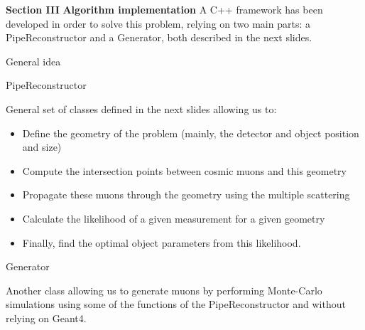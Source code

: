\documentclass[8 pt]{beamer}
\begin{document}
\begin{frame}{}
\centering
	\huge{\textbf{\color{mycolor} Section III}} \newline
	\LARGE{\textbf{\color{mycolor} Algorithm implementation \color{black}}} \vfill
\Large{A C++ framework has been developed in order to solve this problem, relying on two main parts: a PipeReconstructor and a Generator, both described in the next slides.} \vfill
\end{frame}

\begin{frame}{General idea}
\begin{exampleblock}{} PipeReconstructor \end{exampleblock}
\justifying
General set of classes defined in the next slides allowing us to:
\begin{itemize}
\justifying
\item Define the geometry of the problem (mainly, the detector and object position and size)
\item Compute the intersection points between cosmic muons and this geometry
\item Propagate these muons through the geometry using the multiple scattering
\item Calculate the likelihood of a given measurement for a given geometry
\item Finally, find the optimal object parameters from this likelihood.
\end{itemize} \vfill

\begin{exampleblock}{} Generator \end{exampleblock}
\justifying
Another class allowing us to generate muons by performing Monte-Carlo simulations using some of the functions of the PipeReconstructor and without relying on Geant4. \vfill

\end{frame}
\end{document}
